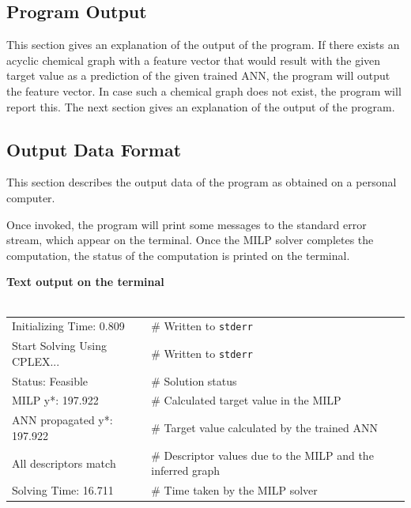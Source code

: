 \documentclass[11pt, titlepage, dvipdfmx, twoside]{article}
\begin{document}
\subsection{Program Output}
\label{sec:section3_3}

This section gives an explanation of the output of the program.
If there exists an acyclic chemical graph with a feature vector that
would result with the given target value as a prediction of
the given trained ANN, the program will output the feature vector.
In case such a chemical graph does not exist, the program will report this.
The next section gives an explanation of the output of the program.


\subsection{Output Data Format}
\label{sec:section3_4}

This section describes the output data of the program as
obtained on a personal computer.

Once invoked, the program will print some messages to the standard error
stream, which appear on the terminal.
Once the MILP solver completes the computation,
the status of the computation is printed on the terminal.

\bigskip

\begin{oframed}
{\bf Text output on the terminal}\\\\
\begin{tabular}{l l}
 Initializing Time: 0.809                &         \# Written to {\tt stderr} \\
Start Solving Using CPLEX...      &       \# Written to {\tt stderr} \\
Status: Feasible 				&       \# Solution status \\
MILP y*: 197.922 				&      \# Calculated target value in the MILP  \\
ANN propagated y*: 197.922     &      \# Target value calculated by the trained ANN  \\
All descriptors match    		&      \# Descriptor values due to the MILP and the inferred  graph \\
Solving Time: 16.711                     &      \# Time taken by the MILP solver \\
\end{tabular}



\end{oframed}
\end{document}
